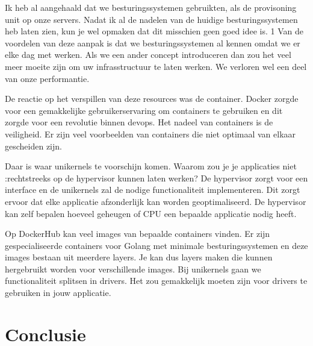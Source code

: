\documentclass[pdftex,a4paper,12pt,twoside]{report}
\begin{document}
Ik heb al aangehaald dat we besturingssystemen gebruikten, als de provisoning unit op onze servers. Nadat ik al de nadelen van de huidige besturingssystemen heb laten zien, kun je wel opmaken dat dit misschien geen goed idee is. 1 Van de voordelen van deze aanpak is dat we besturingssystemen al kennen omdat we er elke dag met werken. Als we een ander concept introduceren dan zou het veel meer moeite zijn om uw infrasstructuur te laten werken. We verloren wel een deel van onze performantie.

De reactie op het verspillen van deze resources was de container. Docker zorgde voor een gemakkelijke gebruikerservaring om containers te gebruiken en dit zorgde voor een revolutie binnen devops. Het nadeel van containers is de veiligheid. Er zijn veel voorbeelden van containers die niet optimaal van elkaar gescheiden zijn.

Daar is waar unikernels te voorschijn komen. Waarom zou je je applicaties niet :rechtstreeks op de hypervisor kunnen laten werken? De hypervisor zorgt voor een interface en de unikernels zal de nodige functionaliteit implementeren. Dit zorgt ervoor dat elke applicatie afzonderlijk kan worden geoptimaliseerd. De hypervisor kan zelf bepalen hoeveel geheugen of CPU een bepaalde applicatie nodig heeft.

Op DockerHub kan veel images van bepaalde containers vinden. Er zijn gespecialiseerde containers voor Golang met minimale besturingssystemen en deze images bestaan uit meerdere layers. Je kan dus layers maken die kunnen hergebruikt worden voor verschillende images. Bij unikernels gaan we functionaliteit splitsen in drivers. Het zou gemakkelijk moeten zijn voor drivers te gebruiken in jouw applicatie.


\chapter{Conclusie}
\label{ch:conclusie}







\listoffigures
\listoftables
\end{document}
